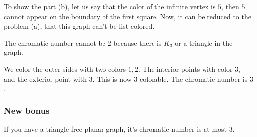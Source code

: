 \documentclass[11pt]{article}
\begin{document}
To show the part (b), let us say that the color of the infinite vertex is
\(5\), then \(5\) cannot appear on the boundary of the first square. Now, it can
be reduced to the problem (a), that this graph can't be list colored.

The chromatic number cannot be \(2\) because there is \(K_3\) or a triangle in
the graph.

We color the outer sides with two colors \(1, 2\). The interior points with
color \(3\), and the exterior point with \(3\). This is now \(3\) colorable. The
chromatic number is \(3\).
\subsubsection{New bonus}
\label{sec:org7e86daf}
If you have a triangle free planar graph, it's chromatic number is at most \(3\).
\end{document}
